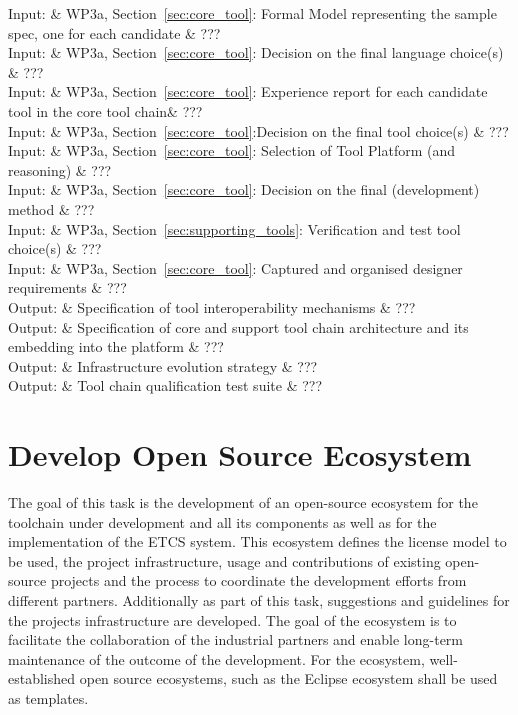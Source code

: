 \documentclass{template/openetcs_article}
\begin{document}
\begin{inoutput}
Input: & WP3a, Section~\ref{sec:core_tool}: Formal Model representing the sample spec, one for each candidate  & ??? \\
Input: & WP3a, Section~\ref{sec:core_tool}: Decision on the final language choice(s) & ??? \\
Input: & WP3a, Section~\ref{sec:core_tool}: Experience report for each candidate tool in the core tool chain& ??? \\
Input: & WP3a, Section~\ref{sec:core_tool}:Decision on the final tool choice(s)  & ??? \\
Input: & WP3a, Section~\ref{sec:core_tool}: Selection of Tool Platform (and reasoning)  & ??? \\
Input: & WP3a, Section~\ref{sec:core_tool}: Decision on the final (development) method  & ??? \\
Input: & WP3a, Section~\ref{sec:supporting_tools}: Verification and test tool choice(s)  & ??? \\
Input: & WP3a, Section~\ref{sec:core_tool}: Captured and organised designer requirements  & ??? \\
\hline
Output: & Specification of tool interoperability mechanisms & ??? \\
Output: & Specification of core and support tool chain architecture and its embedding into the platform & ??? \\
Output: & Infrastructure evolution strategy & ??? \\
Output: & Tool chain qualification test suite & ??? \\
\end{inoutput}



\section{Develop Open Source Ecosystem}
The goal of this task is the development of an open-source ecosystem for the toolchain under development and all its components as well as for the implementation of the ETCS system. This ecosystem defines the license model to be used, the project infrastructure, usage and contributions of existing open-source projects and the process to coordinate the development efforts from different partners. Additionally as part of this task, suggestions and guidelines for the projects infrastructure are developed. The goal of the ecosystem is to facilitate the collaboration of the industrial partners and enable long-term maintenance of the outcome of the development. For the ecosystem, well-established open source ecosystems, such as the Eclipse ecosystem shall be used as templates.
\end{document}
